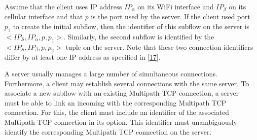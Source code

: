 \documentclass[letterpaper,10pt,english]{sphinxmanual}
\begin{document}
\sphinxAtStartPar
Assume that the client uses IP address \(IP_{\alpha}\) on its Wi\sphinxhyphen{}Fi interface and \(IP_{\beta}\) on its cellular interface and that \(p\) is the port used by the server. If the client used port \(p_1\) to create the initial subflow, then the identifier of this subflow on the server is \(<IP_{S},IP_{\alpha},p,p_{1}>\). Similarly, the second subflow is identified by the \(<IP_{S},IP_{\beta},p,p_{2}>\) tuple on the server. Note that these two connection identifiers differ by at least one IP address as specified in {[}\hyperlink{cite.biblio:id6033}{17}{]}.

\sphinxAtStartPar
A server usually manages a large number of simultaneous connections. Furthermore, a client may establish several connections with the same server. To associate a new subflow with an existing Multipath TCP connection, a server must be able to link an incoming  with the corresponding Multipath TCP connection. For this, the client must include an identifier of the associated Multipath TCP connection in its  option. This identifier must unambiguously identify the corresponding Multipath TCP connection on the server.
\end{document}
